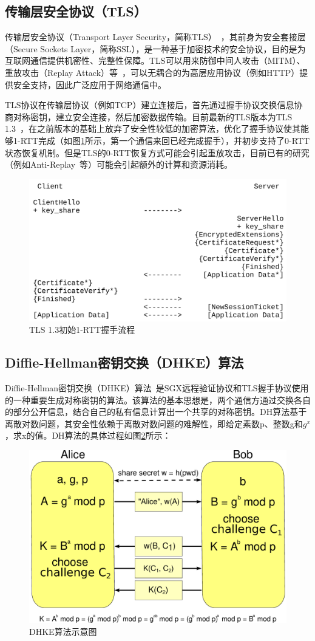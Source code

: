 \subsection{传输层安全协议（TLS）}

传输层安全协议（Transport Layer Security，简称TLS）~\cite{8446}，其前身为安全套接层（Secure Sockets Layer，简称SSL），是一种基于加密技术的安全协议，目的是为互联网通信提供机密性、完整性保障。TLS可以用来防御中间人攻击（MITM）、重放攻击（Replay Attack）等~\cite{8446}，可以无耦合的为高层应用协议（例如HTTP）提供安全支持，因此广泛应用于网络通信中。

TLS协议在传输层协议（例如TCP）建立连接后，首先通过握手协议交换信息协商对称密钥，建立安全连接，然后加密数据传输。目前最新的TLS版本为TLS 1.3~\cite{8446}，在之前版本的基础上放弃了安全性较低的加密算法，优化了握手协议使其能够1-RTT完成（如图\ref{fig:1-rtt}所示，第一个通信来回已经完成握手），并初步支持了0-RTT状态恢复机制。但是TLS的0-RTT恢复方式可能会引起重放攻击，目前已有的研究（例如Anti-Replay~\cite{8446}等）可能会引起额外的计算和资源消耗。

\begin{figure}[!ht]
    \centering
    \includegraphics[width=.65\textwidth]{figures/1-RTT.png}
    \caption{TLS 1.3初始1-RTT握手流程}
    \label{fig:1-rtt}
\end{figure}

\subsection{Diffie-Hellman密钥交换（DHKE）算法}

Diffie-Hellman密钥交换（DHKE）算法~\cite{Diffie1976NewDI}是SGX远程验证协议和TLS握手协议使用的一种重要生成对称密钥的算法。该算法的基本思想是，两个通信方通过交换各自的部分公开信息，结合自己的私有信息计算出一个共享的对称密钥。DH算法基于离散对数问题，其安全性依赖于离散对数问题的难解性，即给定素数p、整数g和$g^x$，求x的值。DH算法的具体过程如图\ref{fig:dhke}所示：

\begin{figure}[!ht]
    \centering
    \includegraphics[width=.5\textwidth]{figures/DHKE.pdf}
    \caption{DHKE算法示意图}
    \label{fig:dhke}
\end{figure}



